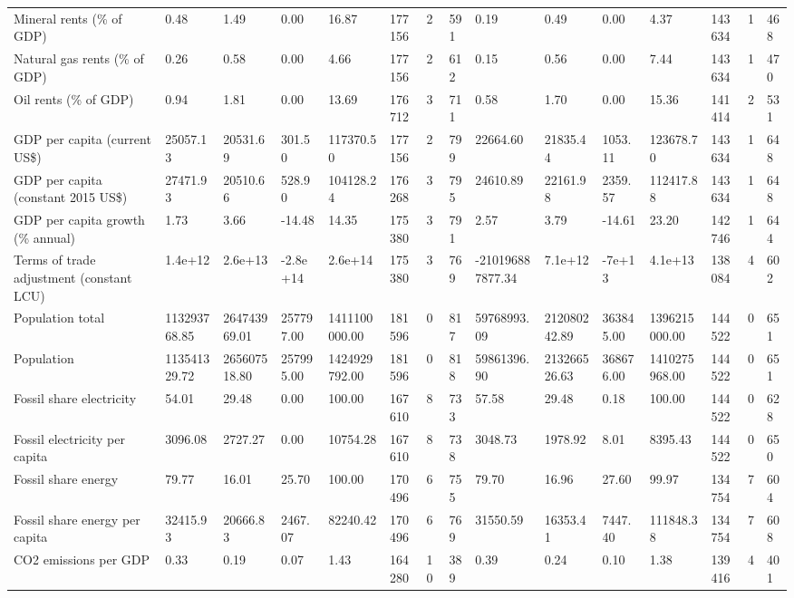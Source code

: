 \begin{longtable}{lllllllllllllll}
\addlinespace
Mineral rents (\% of GDP) & 0.48 & 1.49 & 0.00 & 16.87 & 177156 & 2 & 591 & 0.19 & 0.49 & 0.00 & 4.37 & 143634 & 1 & 468\\
Natural gas rents (\% of GDP) & 0.26 & 0.58 & 0.00 & 4.66 & 177156 & 2 & 612 & 0.15 & 0.56 & 0.00 & 7.44 & 143634 & 1 & 470\\
Oil rents (\% of GDP) & 0.94 & 1.81 & 0.00 & 13.69 & 176712 & 3 & 711 & 0.58 & 1.70 & 0.00 & 15.36 & 141414 & 2 & 531\\
GDP per capita (current US\$) & 25057.13 & 20531.69 & 301.50 & 117370.50 & 177156 & 2 & 799 & 22664.60 & 21835.44 & 1053.11 & 123678.70 & 143634 & 1 & 648\\
GDP per capita (constant 2015 US\$) & 27471.93 & 20510.66 & 528.90 & 104128.24 & 176268 & 3 & 795 & 24610.89 & 22161.98 & 2359.57 & 112417.88 & 143634 & 1 & 648\\
\addlinespace
GDP per capita growth (\% annual) & 1.73 & 3.66 & -14.48 & 14.35 & 175380 & 3 & 791 & 2.57 & 3.79 & -14.61 & 23.20 & 142746 & 1 & 644\\
Terms of trade adjustment (constant LCU) & 1.4e+12 & 2.6e+13 & -2.8e+14 & 2.6e+14 & 175380 & 3 & 769 & -210196887877.34 & 7.1e+12 & -7e+13 & 4.1e+13 & 138084 & 4 & 602\\
Population total & 113293768.85 & 264743969.01 & 257797.00 & 1411100000.00 & 181596 & 0 & 817 & 59768993.09 & 212080242.89 & 363845.00 & 1396215000.00 & 144522 & 0 & 651\\
Population & 113541329.72 & 265607518.80 & 257995.00 & 1424929792.00 & 181596 & 0 & 818 & 59861396.90 & 213266526.63 & 368676.00 & 1410275968.00 & 144522 & 0 & 651\\
Fossil share electricity & 54.01 & 29.48 & 0.00 & 100.00 & 167610 & 8 & 733 & 57.58 & 29.48 & 0.18 & 100.00 & 144522 & 0 & 628\\
\addlinespace
Fossil electricity per capita & 3096.08 & 2727.27 & 0.00 & 10754.28 & 167610 & 8 & 738 & 3048.73 & 1978.92 & 8.01 & 8395.43 & 144522 & 0 & 650\\
Fossil share energy & 79.77 & 16.01 & 25.70 & 100.00 & 170496 & 6 & 755 & 79.70 & 16.96 & 27.60 & 99.97 & 134754 & 7 & 604\\
Fossil share energy per capita & 32415.93 & 20666.83 & 2467.07 & 82240.42 & 170496 & 6 & 769 & 31550.59 & 16353.41 & 7447.40 & 111848.38 & 134754 & 7 & 608\\
CO2 emissions per GDP & 0.33 & 0.19 & 0.07 & 1.43 & 164280 & 10 & 389 & 0.39 & 0.24 & 0.10 & 1.38 & 139416 & 4 & 401\\

\end{longtable}
